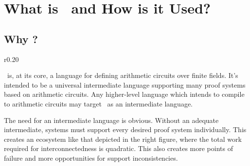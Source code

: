 \section{What is \vampir\ and How is it Used?}

\subsection{Why \vampir?}

\newcommand{\lineOO}{(lO.center) to[out=0, in=180] (sO.center)}
\newcommand{\lineOT}{(lO.center) to[out=-45, in=135] (sT.center)}
\newcommand{\lineOR}{(lO.center) to[out=-80, in=100] (sR.center)}
\newcommand{\lineTO}{(lT.center) to[out=45, in=-135] (sO.center)}
\newcommand{\lineTT}{(lT.center) to[out=0, in=180] (sT.center)}
\newcommand{\lineTR}{(lT.center) to[out=-45, in=135] (sR.center)}
\newcommand{\lineRO}{(lR.center) to[out=80, in=-100] (sO.center)}
\newcommand{\lineRT}{(lR.center) to[out=45, in=-135] (sT.center)}
\newcommand{\lineRR}{(lR.center) to[out=0, in=180] (sR.center)}

\begin{wrapfigure}{r}{0.20\textwidth} %
    \centering
\end{wrapfigure}

\vampir\ is, at its core, a language for defining arithmetic circuits over finite fields. It's intended to be a universal intermediate language supporting many proof systems based on arithmetic circuits. Any higher-level language which intends to compile to arithmetic circuits may target \vampir\ as an intermediate language. 

The need for an intermediate language is obvious. Without an adequate intermediate, systems must support every desired proof system individually. This creates an ecosystem like that depicted in the right figure, where the total work required for interconnectedness is quadratic. This also creates more points of failure and more opportunities for support inconsistencies.

